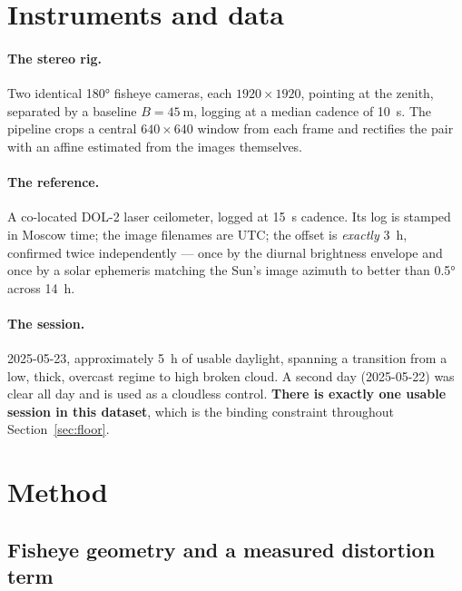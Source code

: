 \documentclass[11pt,a4paper]{article}
\begin{document}
\section{Instruments and data}
\label{sec:data}

\paragraph{The stereo rig.} Two identical \ang{180} fisheye cameras, each
$1920 \times 1920$, pointing at the zenith, separated by a baseline
$B = \SI{45}{\metre}$, logging at a median cadence of \SI{10}{\second}. The pipeline crops a
central $640 \times 640$ window from each frame and rectifies the pair with an affine
estimated from the images themselves.

\paragraph{The reference.} A co-located DOL-2 laser ceilometer, logged at \SI{15}{\second}
cadence. Its log is stamped in Moscow time; the image filenames are UTC; the offset is
\emph{exactly} \SI{+3}{\hour}, confirmed twice independently --- once by the diurnal
brightness envelope and once by a solar ephemeris matching the Sun's image azimuth to better
than \ang{0.5} across \SI{14}{\hour}.

\paragraph{The session.} 2025-05-23, approximately \SI{5}{\hour} of usable daylight, spanning
a transition from a low, thick, overcast regime to high broken cloud. A second day (2025-05-22)
was clear all day and is used as a cloudless control. \textbf{There is exactly one usable
session in this dataset}, which is the binding constraint throughout
Section~\ref{sec:floor}.

\section{Method}
\label{sec:method}

\subsection{Fisheye geometry and a measured distortion term}
\end{document}
